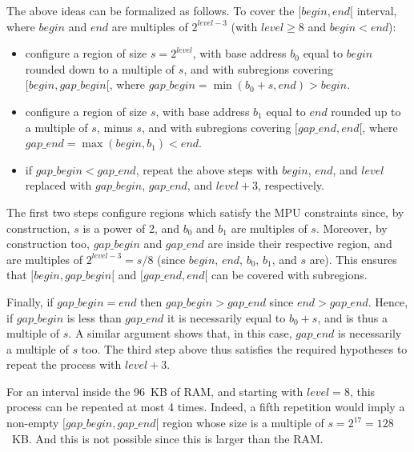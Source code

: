 The above ideas can be formalized as follows. To cover the
$[\mathit{begin},\mathit{end}[$ interval, where $\mathit{begin}$ and
$\mathit{end}$ are multiples of $2^{\mathit{level}-3}$ (with $\mathit{level}
\ge 8$ and $\mathit{begin} < \mathit{end}$):
\begin{itemize}
  \item configure a region of size $s=2^{\mathit{level}}$, with base address
  $b_0$ equal to $\mathit{begin}$ rounded down to a multiple of $s$, and with
  subregions covering $[\mathit{begin}, \mathit{gap\_begin}[$, where
  $\mathit{gap\_begin} = \min(b_0 + s, \mathit{end}) > \mathit{begin}$.

  \item configure a region of size $s$, with base address $b_1$ equal to
  $\mathit{end}$ rounded up to a multiple of $s$, minus $s$, and with
  subregions covering $[\mathit{gap\_end}, \mathit{end}[$, where
  $\mathit{gap\_end} = \max(\mathit{begin}, \mathit{b_1}) < \mathit{end}$.

  \item if $\mathit{gap\_begin} < \mathit{gap\_end}$, repeat the above steps
  with $\mathit{begin}$, $\mathit{end}$, and $\mathit{level}$ replaced with
  $\mathit{gap\_begin}$, $\mathit{gap\_end}$, and $\mathit{level}+3$,
  respectively.
\end{itemize}

The first two steps configure regions which satisfy the MPU constraints since,
by construction, $s$ is a power of 2, and $b_0$ and $b_1$ are multiples of $s$.
Moreover, by construction too, $\mathit{gap\_begin}$ and $\mathit{gap\_end}$
are inside their respective region, and are multiples of
$2^{\mathit{level}-3}=s/8$ (since $\mathit{begin}$, $\mathit{end}$, $b_0$,
$b_1$, and $s$ are). This ensures that $[\mathit{begin}, \mathit{gap\_begin}[$
and $[\mathit{gap\_end}, \mathit{end}[$ can be covered with subregions.

Finally, if $\mathit{gap\_begin}=\mathit{end}$ then $\mathit{gap\_begin} >
\mathit{gap\_end}$ since $\mathit{end} > \mathit{gap\_end}$. Hence, if
$\mathit{gap\_begin}$ is less than $\mathit{gap\_end}$ it is necessarily equal
to $b_0+s$, and is thus a multiple of $s$. A similar argument shows that, in
this case, $\mathit{gap\_end}$ is necessarily a multiple of $s$ too. The third
step above thus satisfies the required hypotheses to repeat the process with
$\mathit{level}+3$.

For an interval inside the 96~KB of RAM, and starting with $\mathit{level}=8$,
this process can be repeated at most 4 times. Indeed, a fifth repetition would
imply a non-empty $[\mathit{gap\_begin}, \mathit{gap\_end}[$ region whose size
is a multiple of $s=2^{17}=128$~KB. And this is not possible since this is
larger than the RAM.

